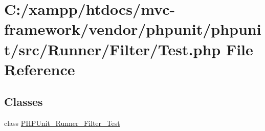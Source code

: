\hypertarget{vendor_2phpunit_2phpunit_2src_2_runner_2_filter_2test_8php}{}\section{C\+:/xampp/htdocs/mvc-\/framework/vendor/phpunit/phpunit/src/\+Runner/\+Filter/\+Test.php File Reference}
\label{vendor_2phpunit_2phpunit_2src_2_runner_2_filter_2test_8php}
\subsection*{Classes}
\begin{DoxyCompactItemize}
\item 
class \hyperlink{class_p_h_p_unit___runner___filter___test}{P\+H\+P\+Unit\+\_\+\+Runner\+\_\+\+Filter\+\_\+\+Test}
\end{DoxyCompactItemize}
